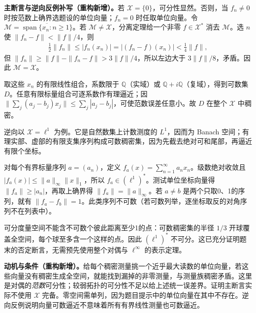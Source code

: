 \documentclass[../../main.tex]{subfiles}
\begin{document}
\begin{solution}
\textbf{主断言与逆向反例补写（重构新增）。}若 $\mathcal X=\{0\}$，可分性显然。否则，当 $f_n\ne0$ 时按范数上确界选题设的单位向量；$f_n=0$ 时任取单位向量。令 $\mathcal M=\overline{\operatorname{span}\{x_n:n\ge1\}}$。若 $\mathcal M\ne\mathcal X$，分离定理给一个非零 $f\in\mathcal X^*$ 消去 $\mathcal M$。选 $n$ 使 $\|f_n-f\|<\|f\|/4$，则
\begin{align*}
\tfrac12\|f_n\|\le|f_n(x_n)|=|(f_n-f)(x_n)|<\tfrac14\|f\|,
\end{align*}
但 $\|f_n\|\ge\|f\|-\|f_n-f\|>3\|f\|/4$，所以左边大于 $3\|f\|/8$，矛盾。因此 $\mathcal M=\mathcal X$。

取这些 $x_n$ 的有限线性组合，系数限于 $\mathbb Q$（实域）或 $\mathbb Q+i\mathbb Q$（复域），得到可数集 $D$。任意有限标量组合可逐系数作有理逼近；因 $\|\sum_j(a_j-b_j)x_j\|\le\sum_j|a_j-b_j|$，可使范数误差任意小。故 $D$ 在整个 $\mathcal X$ 中稠密。

逆向以 $\mathcal X=\ell^1$ 为例。它是自然数集上计数测度的 $L^1$，因而为 Banach 空间；有理实部、虚部的有限支集序列构成可数稠密集，因为先截去绝对可和尾部，再逼近有限个坐标。

对每个有界标量序列 $a=(a_n)$，定义 $f_a(x)=\sum_{n=1}^\infty a_nx_n$。级数绝对收敛且 $|f_a(x)|\le\|a\|_\infty\|x\|_1$，所以 $f_a\in(\ell^1)^*$。测试单位坐标向量得 $\|f_a\|\ge|a_n|$，再取上确界得 $\|f_a\|=\|a\|_\infty$。若 $a\ne b$ 是两个只取0、1的序列，就有 $\|f_a-f_b\|=1$。此类序列不可数（若可数列举，逐坐标取反的对角序列不在列表中）。

可分度量空间不能含不可数个彼此距离至少1的点：可数稠密集的半径 $1/3$ 开球覆盖全空间，每个球至多含一个这样的点。因此 $(\ell^1)^*$ 不可分。这已充分证明题末的否定断言，无需预先使用整个对偶与 $\ell^\infty$ 的表示定理。
\end{solution}
\begin{remark}
\textbf{动机与条件（重构新增）。}给每个稠密测量挑一个近乎最大读数的单位向量，若这些向量没有稠密生成全空间，就能找到漏掉的非零测量，与测量族稠密矛盾。这里是对偶的\emph{范数}可分性；较弱拓扑的可分性不足以给上述统一误差界。证明主断言实际不使用 $\mathcal X$ 完备。零空间需单列，因为题目提示中的单位向量在其中不存在。逆向反例说明向量可数逼近不意味着所有有界线性测量也可数逼近。
\end{remark}
\end{document}
